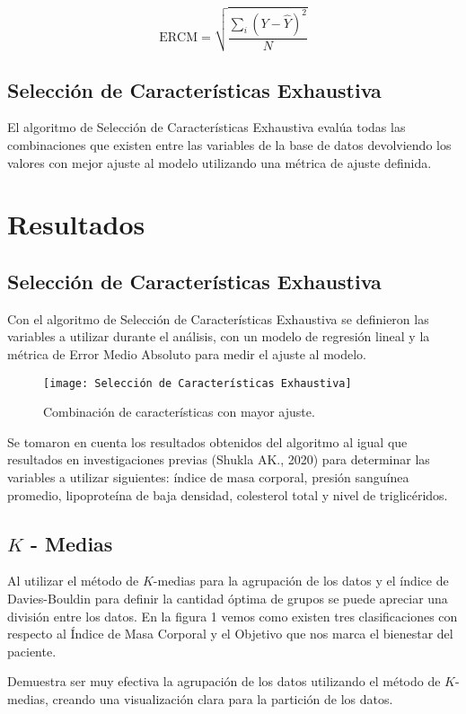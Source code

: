 \documentclass{article}
\begin{document}
$$\text{ERCM} = \sqrt{\frac{\sum_{i} (Y - \hat{Y})^2}{N}}$$

\subsection{Selección de Características Exhaustiva}
El algoritmo de Selección de Características Exhaustiva evalúa todas las combinaciones que existen entre las variables de la base de datos devolviendo los valores con mejor ajuste al modelo utilizando una métrica de ajuste definida.

\section{Resultados}

\subsection{Selección de Características Exhaustiva}
Con el algoritmo de Selección de Características Exhaustiva se definieron las variables a utilizar durante el análisis, con un modelo de regresión lineal y la métrica de Error Medio Absoluto para medir el ajuste al modelo.

\begin{figure}[h!]
\centering
\texttt{[image: Selección de Características Exhaustiva]}
\caption{Combinación de características con mayor ajuste.}
\label{fig:cluster}
\end{figure}

Se tomaron en cuenta los resultados obtenidos del algoritmo al igual que resultados en investigaciones previas (Shukla AK., 2020) para determinar las variables a utilizar siguientes: índice de masa corporal, presión sanguínea promedio, lipoproteína de baja densidad, colesterol total y nivel de triglicéridos. 

\subsection{$K$ - Medias}
Al utilizar el método de $K$-medias para la agrupación de los datos y el índice de Davies-Bouldin para definir la cantidad óptima de grupos se puede apreciar una división entre los datos. En la figura 1 vemos como existen tres clasificaciones con respecto al Índice de Masa Corporal y el Objetivo que nos marca el bienestar del paciente.

Demuestra ser muy efectiva la agrupación de los datos utilizando el método de $K$-medias, creando una visualización clara para la partición de los datos.
\end{document}

